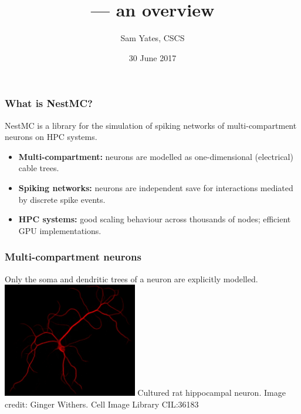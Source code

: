 \documentclass[aspectratio=43,12pt]{beamer}
\author{Sam Yates, CSCS}
\title{\nestmc{} --- an overview}
\date{30 June 2017}
\newcommand{\nestmc}{NestMC}
\begin{document}
\cscstitle

\begin{frame}
\frametitle{What is \nestmc?}
\vfill
\nestmc{} is a library for the simulation of
spiking networks of multi-compartment neurons
on HPC systems.


\vfill
\begin{itemize}
\item {\bf Multi-compartment:}
neurons are modelled as one-dimensional (electrical)
cable trees.
\item {\bf Spiking networks:}
neurons are independent save for
interactions mediated by discrete spike events.
\item {\bf HPC systems:}
good scaling behaviour across thousands of nodes;
efficient GPU implementations.
\end{itemize}
\vfill

\end{frame}

\begin{frame}
\frametitle{Multi-compartment neurons}
Only the soma and dendritic trees of a neuron
are explicitly modelled.
\vfill
\centering 
\includegraphics[height=5cm]{images/rat-hippocampal-neuron.jpg}
\vfill
{\tiny Cultured rat hippocampal neuron. Image credit: Ginger Withers. Cell Image Library CIL:36183}
\end{frame}
\end{document}
